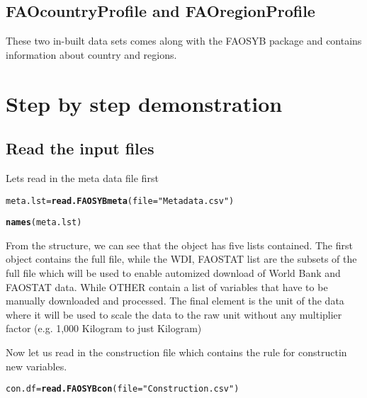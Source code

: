 \documentclass{article}\usepackage{graphicx, color}
\makeatletter
\newcommand{\hlfunctioncall}[1]{\textcolor[rgb]{0.501960784313725,0,0.329411764705882}{\textbf{#1}}}%
\newcommand{\hlstring}[1]{\textcolor[rgb]{0.6,0.6,1}{#1}}%
\newenvironment{kframe}{%
 \def\at@end@of@kframe{}%
 \ifinner\ifhmode%
  \def\at@end@of@kframe{\end{minipage}}%
  \begin{minipage}{\columnwidth}%
 \fi\fi%
 \def\FrameCommand##1{\hskip\@totalleftmargin \hskip-\fboxsep
 \colorbox{shadecolor}{##1}\hskip-\fboxsep
     \hskip-\linewidth \hskip-\@totalleftmargin \hskip\columnwidth}%
 \MakeFramed {\advance\hsize-\width
   \@totalleftmargin\z@ \linewidth\hsize
   \@setminipage}}%
 {\par\unskip\endMakeFramed%
 \at@end@of@kframe}
\newenvironment{knitrout}{}{} %
\makeatother
\begin{document}
\subsection{FAOcountryProfile and FAOregionProfile}
These two in-built data sets comes along with the FAOSYB package and
contains information about country and regions.

\section{Step by step demonstration}

\subsection{Read the input files}
Lets read in the meta data file first

\begin{knitrout}
\color{fgcolor}\begin{kframe}
\begin{alltt}
meta.lst = \hlfunctioncall{read.FAOSYBmeta}(file = \hlstring{"Metadata.csv"})
\end{alltt}


{\ttfamily\noindent\bfseries\color{errorcolor}{\#\# Error: could not find function "read.FAOSYBmeta"}}\begin{alltt}
\hlfunctioncall{names}(meta.lst)
\end{alltt}


{\ttfamily\noindent\bfseries\color{errorcolor}{\#\# Error: object 'meta.lst' not found}}\end{kframe}
\end{knitrout}



From the structure, we can see that the object has five lists
contained. The first object contains the full file, while the WDI,
FAOSTAT list are the subsets of the full file which will be used to
enable automized download of World Bank and FAOSTAT data. While OTHER
contain a list of variables that have to be manually downloaded and
processed. The final element is the unit of the data where it will be
used to scale the data to the raw unit without any multiplier factor
(e.g. 1,000 Kilogram to just Kilogram)

Now let us read in the construction file which contains the rule for
constructin new variables.

\begin{knitrout}
\color{fgcolor}\begin{kframe}
\begin{alltt}
con.df = \hlfunctioncall{read.FAOSYBcon}(file = \hlstring{"Construction.csv"})
\end{alltt}


{\ttfamily\noindent\bfseries\color{errorcolor}{\#\# Error: could not find function "read.FAOSYBcon"}}\end{kframe}
\end{knitrout}
\end{document}
